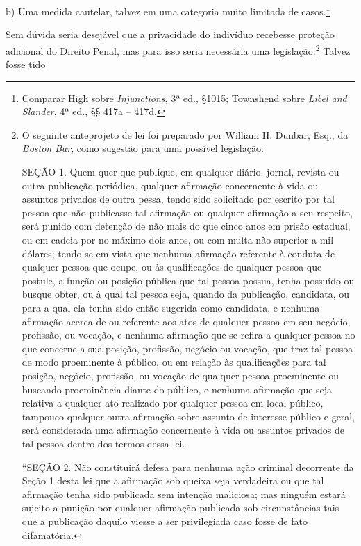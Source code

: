 b) Uma medida cautelar, talvez em uma categoria muito limitada de
casos.\footnote{Comparar High sobre \emph{Injunctions}, 3ª ed., §1015;
  Townshend sobre \emph{Libel and Slander}, 4ª ed., §§ 417a -- 417d.}

Sem dúvida seria desejável que a privacidade do indivíduo recebesse
proteção adicional do Direito Penal, mas para isso seria necessária uma
legislação.\footnote{O seguinte anteprojeto de lei foi preparado por
  William H. Dunbar, Esq., da \emph{Boston Bar}, como sugestão para uma
  possível legislação:

  SEÇÃO 1. Quem quer que publique, em qualquer diário, jornal, revista
  ou outra publicação periódica, qualquer afirmação concernente à vida
  ou assuntos privados de outra pessa, tendo sido solicitado por escrito
  por tal pessoa que não publicasse tal afirmação ou qualquer afirmação
  a seu respeito, será punido com detenção de não mais do que cinco anos
  em prisão estadual, ou em cadeia por no máximo dois anos, ou com multa
  não superior a mil dólares; tendo-se em vista que nenhuma afirmação
  referente à conduta de qualquer pessoa que ocupe, ou às qualificações
  de qualquer pessoa que postule, a função ou posição pública que tal
  pessoa possua, tenha possuído ou busque obter, ou à qual tal pessoa
  seja, quando da publicação, candidata, ou para a qual ela tenha sido
  então sugerida como candidata, e nenhuma afirmação acerca de ou
  referente aos atos de qualquer pessoa em seu negócio, profissão, ou
  vocação, e nenhuma afirmação que se refira a qualquer pessoa no que
  concerne a sua posição, profissão, negócio ou vocação, que traz tal
  pessoa de modo proeminente à público, ou em relação às qualificações
  para tal posição, negócio, profissão, ou vocação de qualquer pessoa
  proeminente ou buscando proeminência diante do público, e nenhuma
  afirmação que seja relativa a qualquer ato realizado por qualquer
  pessoa em local público, tampouco qualquer outra afirmação sobre
  assunto de interesse público e geral, será considerada uma afirmação
  concernente à vida ou assuntos privados de tal pessoa dentro dos
  termos dessa lei.

  ``SEÇÃO 2. Não constituirá defesa para nenhuma ação criminal
  decorrente da Seção 1 desta lei que a afirmação sob queixa seja
  verdadeira ou que tal afirmação tenha sido publicada sem intenção
  maliciosa; mas ninguém estará sujeito a punição por qualquer afirmação
  publicada sob circunstâncias tais que a publicação daquilo viesse a
  ser privilegiada caso fosse de fato difamatória.} Talvez fosse tido
